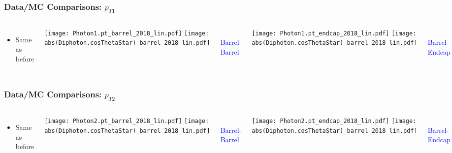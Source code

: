 \documentclass{beamer}
\newcommand\Wider[2][3em]{%
\makebox[\linewidth][c]{%
  \begin{minipage}{\dimexpr\textwidth+#1\relax}
  \raggedright#2
  \end{minipage}%
  }%
}
\begin{document}
\begin{frame}[t]
\frametitle{Data/MC Comparisons: $p_{T1}$}
\begin{columns}[T]
  \begin{itemize}
    \item {\footnotesize \raggedleft Same as before }
  \end{itemize}

\Wider[2.9em]{
\raggedleft
\rotatebox{90}{\parbox{4cm}{\raggedleft \small{\textcolor{blue}{Full 2018 dataset}}}}\\
}
\Wider[3.4em]{
\raggedleft
\rotatebox{90}{\parbox{4cm}{\raggedleft \small{\textcolor{blue}{New 2018 data}}}}
}

\texttt{[image: Photon1.pt\_barrel\_2018\_lin.pdf]}
\texttt{[image: abs(Diphoton.cosThetaStar)\_barrel\_2018\_lin.pdf]}
\caption{\textcolor{white}{ta-} \textcolor{blue}{\small {Barrel-Barrel}}}

\texttt{[image: Photon1.pt\_endcap\_2018\_lin.pdf]}
\texttt{[image: abs(Diphoton.cosThetaStar)\_barrel\_2018\_lin.pdf]}
\caption{\textcolor{white}{ta-} \textcolor{blue}{\small {Barrel-Endcap}}}
\end{columns}
\end{frame}

\begin{frame}[t]
\frametitle{Data/MC Comparisons: $p_{T2}$}
\begin{columns}[T]
  \begin{itemize}
    \item {\footnotesize \raggedleft Same as before }
  \end{itemize}

\Wider[2.9em]{
\raggedleft
\rotatebox{90}{\parbox{4cm}{\raggedleft \small{\textcolor{blue}{Full 2018 dataset}}}}\\
}
\Wider[3.4em]{
\raggedleft
\rotatebox{90}{\parbox{4cm}{\raggedleft \small{\textcolor{blue}{New 2018 data}}}}
}

\texttt{[image: Photon2.pt\_barrel\_2018\_lin.pdf]}
\texttt{[image: abs(Diphoton.cosThetaStar)\_barrel\_2018\_lin.pdf]}
\caption{\textcolor{white}{ta-} \textcolor{blue}{\small {Barrel-Barrel}}}

\texttt{[image: Photon2.pt\_endcap\_2018\_lin.pdf]}
\texttt{[image: abs(Diphoton.cosThetaStar)\_barrel\_2018\_lin.pdf]}
\caption{\textcolor{white}{ta-} \textcolor{blue}{\small {Barrel-Endcap}}}
\end{columns}
\end{frame}
\end{document}
